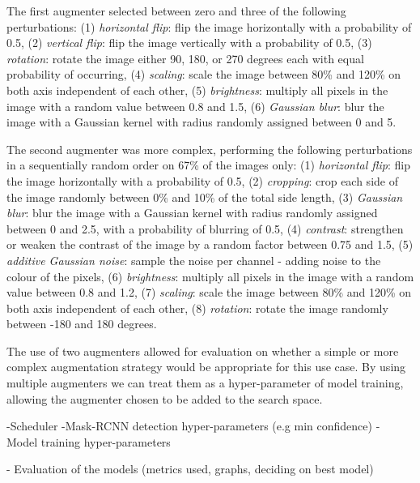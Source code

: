 The first augmenter selected between zero and three of the following perturbations: (1) \textit{horizontal flip}: flip the image horizontally with a probability of 0.5, (2) \textit{vertical flip}: flip the image vertically with a probability of 0.5, (3) \textit{rotation}: rotate the image either 90, 180, or 270 degrees each with equal probability of occurring, (4) \textit{scaling}: scale the image between 80\% and 120\% on both axis independent of each other, (5) \textit{brightness}: multiply all pixels in the image with a random value between 0.8 and 1.5, (6) \textit{Gaussian blur}: blur the image with a Gaussian kernel with radius randomly assigned between 0 and  5. 

The second augmenter was more complex, performing the following perturbations in a sequentially random order on 67\% of the images only: (1) \textit{horizontal flip}: flip the image horizontally with a probability of 0.5, (2) \textit{cropping}: crop each side of the image randomly between 0\% and 10\% of the total side length, (3) \textit{Gaussian blur}: blur the image with a Gaussian kernel with radius randomly assigned between 0 and 2.5, with a probability of blurring of 0.5, (4) \textit{contrast}: strengthen or weaken the contrast of the image by a random factor between 0.75 and 1.5, (5) \textit{additive Gaussian noise}: sample the noise per channel - adding noise to the colour of the pixels, (6) \textit{brightness}: multiply all pixels in the image with a random value between 0.8 and 1.2, (7) \textit{scaling}: scale the image between 80\% and 120\% on both axis independent of each other, (8) \textit{rotation}: rotate the image randomly between -180 and 180 degrees. 

The use of two augmenters allowed for evaluation on whether a simple or more complex augmentation strategy would be appropriate for this use case. By using multiple augmenters we can treat them as a hyper-parameter of model training, allowing the augmenter chosen to be added to the search space. 


-Scheduler
-Mask-RCNN detection hyper-parameters (e.g min confidence)
- Model training hyper-parameters

- Evaluation of the models (metrics used, graphs, deciding on best model)

